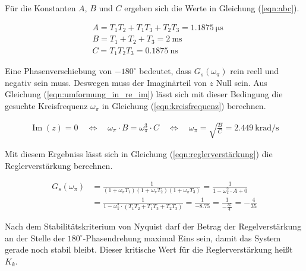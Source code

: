Für die Konstanten $A$, $B$ und $C$ ergeben sich die Werte in Gleichung (\ref{eqn:abc}).

\begin{equation}
    \begin{split}
         & A=T_1 T_2 + T_1 T_3 + T_2 T_3 = \SI{1.1875}{\micro\second} \\
         & B=T_1+T_2+T_3 = \SI{2}{\milli\second}                      \\
         & C=T_1 T_2 T_3 = \SI{0.1875}{\nano\second}
    \end{split}
    \label{eqn:abc}
\end{equation}

Eine Phasenverschiebung von $-180^\circ$ bedeutet, dass $G_s(\omega_{\pi})$ rein reell und negativ sein muss. 
Deswegen muss der Imaginärteil von $z$ Null sein. 
Aus Gleichung (\ref{eqn:umformung_in_re_im}) lässt sich mit dieser Bedingung die gesuchte Kreisfrequenz $\omega_{\pi}$ in Gleichung (\ref{eqn:kreisfrequenz}) berechnen.

\begin{equation}
    \begin{split}
        \operatorname{Im}(z)=0
        \quad \Leftrightarrow \quad
        \omega_{\pi} \cdot B = \omega_{\pi}^3 \cdot C
        \quad \Leftrightarrow \quad
        \omega_{\pi}=\sqrt{\frac{B}{C}}= \SI[per-mode=fraction]{2.449}{\kilo\radian\per\second}
    \end{split}
\end{equation}

Mit diesem Ergebniss lässt sich in Gleichung (\ref{eqn:reglerverstärkung}) die Reglerverstärkung berechnen.

\begin{equation}
    \begin{split}
        G_s(\omega_{\pi}) & = \frac{1}{(1+\omega_{\pi} T_1)(1+\omega_{\pi} T_2)(1+\omega_{\pi} T_3)} = \frac{1}{1-\omega_{\pi}^2 \cdot A + 0}          \\
                          & = \frac{1}{1-\omega_{\pi}^2 \cdot (T_1 T_2 + T_1 T_3 + T_2 T_3)} = \frac{1}{-8.75} = \frac{1}{-\frac{35}{4}}=-\frac{4}{35}
    \end{split}
    \label{eqn:reglerverstärkung}
\end{equation}

Nach dem Stabilitätskriterium von Nyquist darf der Betrag der Regelverstärkung an der Stelle der $180^{\circ}$-Phasendrehung maximal Eins sein, damit das System gerade noch stabil bleibt. 
Dieser kritische Wert für die Reglerverstärkung heißt $K_k$.


